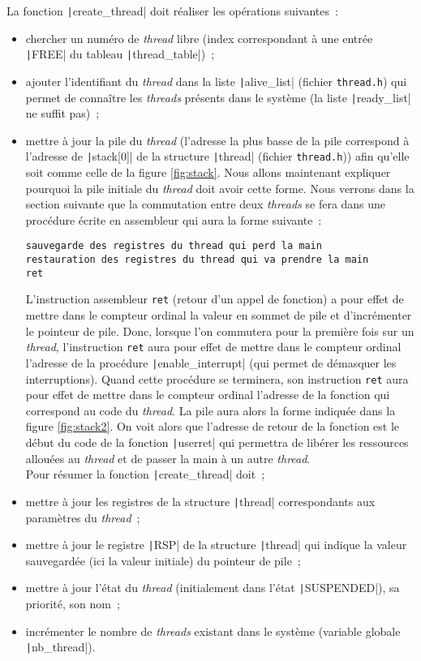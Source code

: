 \documentclass[a4paper]{article}
\begin{document}
La fonction \texttt|create_thread| doit réaliser les opérations suivantes~:

\begin{itemize}

\item chercher un numéro de \emph{thread} libre (index correspondant à une entrée \texttt|FREE| du tableau \texttt|thread_table|)~;
\item ajouter l'identifiant du \emph{thread} dans la liste \texttt|alive_list| (fichier \verb+thread.h+) qui permet de connaître
les \emph{threads} présents dans le système (la liste \texttt|ready_list| ne suffit pas)~; 
\item mettre à jour la pile du \emph{thread} (l'adresse la plus basse de la pile correspond à l'adresse de \texttt|stack[0]| de la structure
\texttt|thread| (fichier \verb+thread.h+)) afin qu'elle soit comme celle de la figure \ref{fig:stack}. Nous allons maintenant expliquer
pourquoi la pile initiale du \emph{thread} doit avoir cette forme. Nous verrons dans la section suivante que la commutation entre
deux \emph{threads} se fera dans une procédure écrite en assembleur qui aura la forme suivante~:\\
\begin{verbatim}
sauvegarde des registres du thread qui perd la main
restauration des registres du thread qui va prendre la main
ret
\end{verbatim}
\vspace{0.4cm}
\noindent L'instruction assembleur \verb+ret+ (retour d'un appel de fonction) a pour effet de mettre dans le compteur ordinal 
la valeur en sommet de pile et d'incrémenter
le pointeur de pile. Donc, lorsque l'on commutera pour la première fois sur un \emph{thread}, l'instruction \verb+ret+ aura pour effet de mettre
dans le compteur ordinal l'adresse de la procédure \texttt|enable_interrupt| (qui permet de démasquer les interruptions). Quand cette procédure se
terminera, son instruction \verb+ret+ aura pour effet de mettre dans le compteur ordinal l'adresse de la fonction qui correspond au 
code du \emph{thread}. La pile
aura alors la forme indiquée dans la figure \ref{fig:stack2}. On voit alors que l'adresse de retour de la fonction est le début du code de la 
fonction \texttt|userret| qui permettra de libérer les ressources allouées au \emph{thread} et de passer la main à un autre \emph{thread}.\\
Pour résumer la fonction \texttt|create_thread| doit~;
\item mettre à jour les registres de la structure \texttt|thread| correspondants aux paramètres du \emph{thread}~;
\item mettre
à jour le registre \texttt|RSP| de la structure \texttt|thread| qui indique la valeur sauvegardée (ici la valeur initiale) du pointeur
de pile~;
\item mettre à jour l'état du \emph{thread} (initialement dans l'état \texttt|SUSPENDED|), sa priorité, son nom~;
\item incrémenter le nombre de \emph{threads} existant dans le système (variable globale \texttt|nb_thread|).
\end{itemize}
\end{document}
